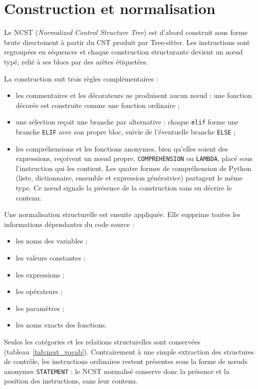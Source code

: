 \documentclass[12pt,a4paper,oneside]{report}
\begin{document}
\section{Construction et normalisation}
\label{sec:ncst_detail}


Le NCST (\emph{Normalized Control Structure Tree}) est d'abord construit sous
forme brute directement à partir du CST produit par Tree-sitter. Les
instructions sont regroupées en séquences et chaque construction structurante
devient un nœud typé, relié à ses blocs par des arêtes étiquetées.

La construction suit trois règles complémentaires :
\begin{itemize}
  \item les commentaires et les décorateurs ne produisent aucun nœud : une
        fonction décorée est construite comme une fonction ordinaire ;
  \item une sélection reçoit une branche par alternative : chaque
        \texttt{elif} forme une branche \texttt{ELIF} avec son propre bloc,
        suivie de l'éventuelle branche \texttt{ELSE} ;
  \item les compréhensions et les fonctions anonymes, bien qu'elles soient
        des expressions, reçoivent un nœud propre, \texttt{COMPREHENSION} ou
        \texttt{LAMBDA}, placé sous l'instruction qui les contient. Les quatre
        formes de compréhension de Python (liste, dictionnaire, ensemble et
        expression génératrice) partagent le même type. Ce nœud signale la
        présence de la construction sans en décrire le contenu.
\end{itemize}

Une normalisation structurelle est ensuite appliquée. Elle supprime toutes les
informations dépendantes du code source :
\begin{itemize}
  \item les noms des variables ;
  \item les valeurs constantes ;
  \item les expressions ;
  \item les opérateurs ;
  \item les paramètres ;
  \item les noms exacts des fonctions.
\end{itemize}

Seules les catégories et les relations structurelles sont conservées
(tableau~\ref{tab:ncst_vocab}). Contrairement à une simple extraction des
structures de contrôle, les instructions ordinaires restent présentes sous la
forme de nœuds anonymes \texttt{STATEMENT} : le NCST normalisé conserve donc
la présence et la position des instructions, sans leur contenu.
\end{document}
